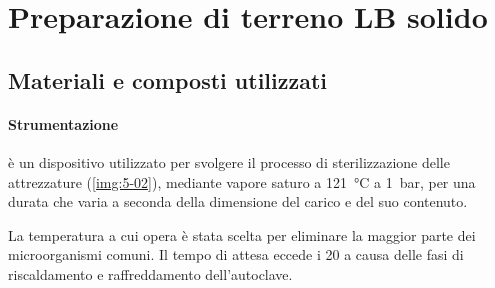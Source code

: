\section{Preparazione di terreno LB solido}\label{sec:prepLBsolido}
\subsection{Materiali e composti utilizzati}
\paragraph{Strumentazione}
\begin{itemize}
	\itemb[Autoclave:] è un dispositivo utilizzato per svolgere il processo di sterilizzazione delle attrezzature (\autoref{img:5-02}), mediante vapore saturo a \qty{121}{\celsius} a \qty{1}{\bar}, per una durata che varia a seconda della dimensione del carico e del suo contenuto.

	La temperatura a cui opera è stata scelta per eliminare la maggior parte dei microorganismi comuni. Il tempo di attesa eccede i \qty{20}{\min} a causa delle fasi di riscaldamento e raffreddamento dell’autoclave.
\end{itemize}

